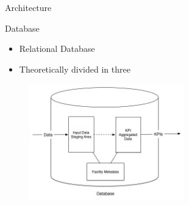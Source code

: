 \begin{frame}{Architecture}

	\begin{block}{Database}
			\begin{itemize}
				\item Relational Database
				\item Theoretically divided in three
			\end{itemize}
	\end{block}


\begin{figure}
  \centering
  \includegraphics[width=0.60\textwidth]{images/DataBase.jpg}
  \label{fig:db}
\end{figure}

\end{frame}

